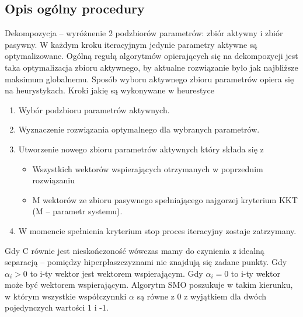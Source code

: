 \documentclass[11pt]{article}
\begin{document}
\subsection{Opis ogólny procedury}
Dekompozycja – wyróżnenie 2 podzbiorów parametrów: zbiór aktywny i zbiór pasywny. W każdym kroku iteracyjnym jedynie parametry aktywne są optymalizowane. Ogólną regułą algorytmów opierających się na dekompozycji jest taka optymalizacja zbioru aktywnego, by aktualne rozwiązanie było jak najbliższe maksimum globalnemu. 
Sposób wyboru aktywnego zbioru parametrów opiera się na heurystykach.
\newline
\newline
Kroki jakię są wykonywane w heurestyce
\begin{enumerate}
\item Wybór podzbioru parametrów aktywnych. 
\item Wyznaczenie rozwiązania optymalnego dla wybranych parametrów.
\item Utworzenie nowego zbioru parametrów aktywnych który składa się z
\begin{itemize}
\item Wszystkich wektorów wspierających otrzymanych w poprzednim rozwiązaniu
\item M wektorów ze zbioru pasywnego spełniającego najgorzej kryterium KKT (M – parametr systemu). 
\end{itemize}
\item W momencie spełnienia kryterium stop proces iteracyjny zostaje zatrzymany. 
\end{enumerate}

Gdy C równie jest nieskończoność wówczas mamy do czynienia z idealną separacją – pomiędzy hiperpłaszczyznami nie znajdują się zadane punkty. 
Gdy $\alpha_{i} > 0 $ to i-ty wektor jest wektorem wspierającym.
Gdy $\alpha_{i} = 0 $ to i-ty wektor może być wektorem wspierającym.
\newline
Algorytm SMO poszukuje w takim kierunku, w którym wszystkie współczynnki $\alpha$ są równe z 0 z wyjątkiem dla dwóch pojedynczych wartości 1 i -1. 
\end{document}
